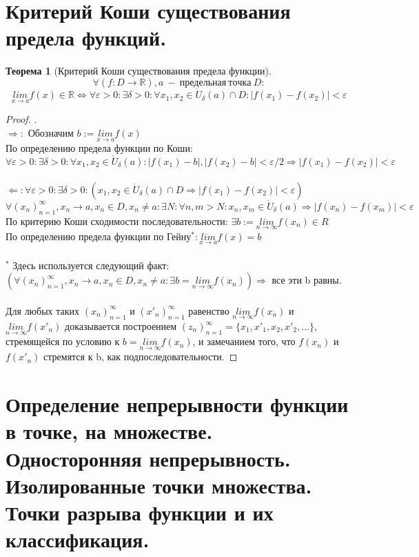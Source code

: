 \documentclass[12pt, a4]{article}
\newtheorem*{theorem}{Теорема}
\renewcommand{\lim}[2]{\underset{#1 \rightarrow #2}{lim}}
\newcommand{\limn}{\lim{n}{\infty}}
\renewcommand{\implies}{\Rightarrow}
\newcommand{\bimplies}{\Leftarrow}
\renewcommand{\iff}{\Leftrightarrow}
\renewcommand{\epsilon}{\varepsilon}
\newcommand{\R}{\mathbb{R}}
\renewcommand{\U}{\mathring{U}}
\begin{document}
\section{Критерий Коши существования предела функций.}

\begin{theorem}[Критерий Коши существования предела функции]
\[\forall (f: D \to \R), a\ -\ предельная\ точка\ D:\]
\[\lim{x}{a} f(x) \in \R \iff \forall \epsilon > 0: \exists \delta > 0: \forall x_1, x_2 \in \U_\delta(a) \cap D: |f(x_1) - f(x_2)| < \epsilon\]
\end{theorem}

\begin{proof}.\\
$\implies:$ Обозначим $b := \lim{x}{a}f(x)$\\
По определению предела функции по Коши: $\forall \epsilon > 0: \exists \delta > 0: \forall x_1, x_2 \in \U_\delta(a): |f(x_1) - b|, |f(x_2) - b| < \epsilon/2 \implies |f(x_1) - f(x_2)| < \epsilon$\\\\
$\bimplies: \forall \epsilon > 0: \exists \delta > 0: (x_1, x_2 \in \U_\delta(a) \cap D \implies |f(x_1) - f(x_2)| < \epsilon)$\\
$\forall (x_n)_{n=1}^\infty, x_n \to a, x_n \in D, x_n \neq a: \exists N: \forall n, m > N: x_n, x_m \in \U_\delta(a) \implies |f(x_n) - f(x_m)| < \epsilon$\\
По критерию Коши сходимости последовательности: $\exists b := \limn f(x_n) \in R$\\
По определению предела функции по Гейну$^*: \lim{x}{a}f(x) = b$\\\\

$^*$ Здесь используется следующий факт:\\ 
$(\forall (x_n)_{n=1}^\infty, x_n \to a, x_n \in D, x_n \neq a:
  \exists b = \limn f(x_n)) \implies$ все эти b равны.\\\\
Для любых таких $(x_n)_{n=1}^\infty$ и $(x'_n)_{n=1}^\infty$ равенство $\limn f(x_n)$ и $\limn f(x'_n)$ доказывается построением $(z_n)_{n=1}^\infty = \{x_1, x'_1, x_2, x'_2, ...\}$, стремящейся по условию к $b = \limn f(x_n)$, и замечанием того, что $f(x_n)$ и $f(x'_n)$ стремятся к b, как подпоследовательности.
\end{proof}

\section{Определение непрерывности функции в точке, на множестве. Односторонняя непрерывность. Изолированные точки множества. Точки разрыва функции и их классификация.}
\end{document}
